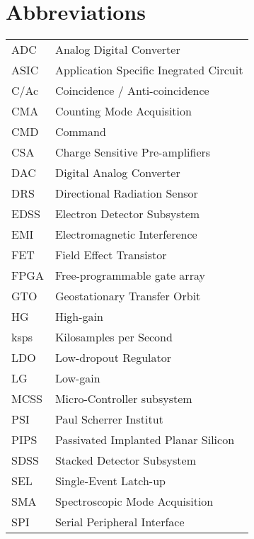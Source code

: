 \section*{Abbreviations}
\label{sec:abbreviations}

\begin{center}
\begin{tabular}{p{2cm}p{8cm}}
	ADC & Analog Digital Converter \\
	ASIC & Application Specific Inegrated Circuit \\
    C/Ac & Coincidence / Anti-coincidence \\
    CMA & Counting Mode Acquisition \\
    CMD & Command					\\
	CSA & Charge Sensitive Pre-amplifiers \\
	DAC & Digital Analog Converter \\
	DRS & Directional Radiation Sensor \\
	EDSS & Electron Detector Subsystem \\
	EMI & Electromagnetic Interference \\
	FET & Field Effect Transistor \\
    FPGA & Free-programmable gate array \\
	GTO & Geostationary Transfer Orbit \\
    HG & High-gain \\
    ksps & Kilosamples per Second \\
	LDO & Low-dropout Regulator \\
    LG & Low-gain \\
    MCSS & Micro-Controller subsystem \\
	PSI & Paul Scherrer Institut \\
	PIPS & Passivated Implanted Planar Silicon \\
	SDSS & Stacked Detector Subsystem \\
	SEL & Single-Event Latch-up \\
    SMA & Spectroscopic Mode Acquisition \\
	SPI & Serial Peripheral Interface \\
\end{tabular}
\end{center}
